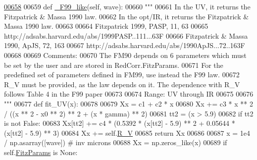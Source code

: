 \begin{DoxyVerb}
\begin{DoxyCode}
\hypertarget{classpyneb_1_1extinction_1_1red__corr_1_1_red_corr_l00658}{}\hyperlink{classpyneb_1_1extinction_1_1red__corr_1_1_red_corr_a8eb0fe7f840c32a87adfcf7ddd98a095}{00658} 
00659     \textcolor{keyword}{def }\hyperlink{classpyneb_1_1extinction_1_1red__corr_1_1_red_corr_a8eb0fe7f840c32a87adfcf7ddd98a095}{\_F99\_like}(self, wave):
00660         \textcolor{stringliteral}{"""}
00661 \textcolor{stringliteral}{        In the UV, it returns the Fitzpatrick & Massa 1990 law.}
00662 \textcolor{stringliteral}{        In the opt/IR, it returns the Fitzpatrick & Massa 1990 law. }
00663 \textcolor{stringliteral}{        }
00664 \textcolor{stringliteral}{        Fitzpatrick 1999, PASP, 11, 63}
00665 \textcolor{stringliteral}{        http://adsabs.harvard.edu/abs/1999PASP..111...63F}
00666 \textcolor{stringliteral}{        Fitzpatrick & Massa 1990, ApJS, 72, 163}
00667 \textcolor{stringliteral}{        http://adsabs.harvard.edu/abs/1990ApJS...72..163F}
00668 \textcolor{stringliteral}{        }
00669 \textcolor{stringliteral}{        Comments:}
00670 \textcolor{stringliteral}{        The FM90 depends on 6 parameters which must be set by the user and are stored in
       RedCorr.FitzParams.}
00671 \textcolor{stringliteral}{        For the predefined set of parameters defined in FM99, use instead the F99 law.}
00672 \textcolor{stringliteral}{        R\_V must be provided, as the law depends on it. The dependence with R\_V follows Table 4 in the F99
       paper }
00673 \textcolor{stringliteral}{}
00674 \textcolor{stringliteral}{        Range: UV through IR}
00675 \textcolor{stringliteral}{        }
00676 \textcolor{stringliteral}{        """}
00677         \textcolor{keyword}{def }fit\_UV(x):
00678 
00679             Xx = c1 + c2 * x
00680             Xx += c3 * x ** 2 / ((x ** 2 - x0 ** 2) ** 2 + (x * gamma) ** 2)
00681             tt2 = (x > 5.9) 
00682             \textcolor{keywordflow}{if} tt2 \textcolor{keywordflow}{is} \textcolor{keywordflow}{not} \textcolor{keyword}{False}:
00683                 Xx[tt2] += c4 * (0.5392 * (x[tt2] - 5.9) ** 2 + 0.05644 * (x[tt2] - 5.9) ** 3)
00684             Xx += self.\hyperlink{classpyneb_1_1extinction_1_1red__corr_1_1_red_corr_a4696ecdd84c912c20e6aa19b1573e875}{R\_V}
00685             \textcolor{keywordflow}{return} Xx
00686             
00687         x = 1e4 / np.asarray([wave]) \textcolor{comment}{# inv microns}
00688         Xx = np.zeros\_like(x)
00689         \textcolor{keywordflow}{if} self.\hyperlink{classpyneb_1_1extinction_1_1red__corr_1_1_red_corr_a133fcc7513d358e629266b24cbe7bebc}{FitzParams} \textcolor{keywordflow}{is} \textcolor{keywordtype}{None}:

\end{DoxyCode}
\end{DoxyVerb}
